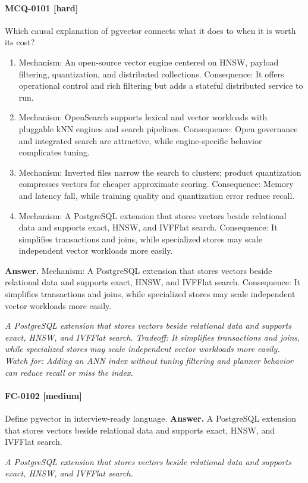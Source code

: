 \paragraph{MCQ-0101 [hard]} Which causal explanation of pgvector connects what it does to when it is worth its cost?
\begin{enumerate}[label=\Alph*.]
\item Mechanism: An open-source vector engine centered on HNSW, payload filtering, quantization, and distributed collections. Consequence: It offers operational control and rich filtering but adds a stateful distributed service to run.
\item Mechanism: OpenSearch supports lexical and vector workloads with pluggable kNN engines and search pipelines. Consequence: Open governance and integrated search are attractive, while engine-specific behavior complicates tuning.
\item Mechanism: Inverted files narrow the search to clusters; product quantization compresses vectors for cheaper approximate scoring. Consequence: Memory and latency fall, while training quality and quantization error reduce recall.
\item Mechanism: A PostgreSQL extension that stores vectors beside relational data and supports exact, HNSW, and IVFFlat search. Consequence: It simplifies transactions and joins, while specialized stores may scale independent vector workloads more easily.
\end{enumerate}
\noindent\textbf{Answer.} Mechanism: A PostgreSQL extension that stores vectors beside relational data and supports exact, HNSW, and IVFFlat search. Consequence: It simplifies transactions and joins, while specialized stores may scale independent vector workloads more easily.
\par\textit{A PostgreSQL extension that stores vectors beside relational data and supports exact, HNSW, and IVFFlat search. Tradeoff: It simplifies transactions and joins, while specialized stores may scale independent vector workloads more easily. Watch for: Adding an ANN index without tuning filtering and planner behavior can reduce recall or miss the index.}
\paragraph{FC-0102 [medium]} Define pgvector in interview-ready language.
\noindent\textbf{Answer.} A PostgreSQL extension that stores vectors beside relational data and supports exact, HNSW, and IVFFlat search.
\par\textit{A PostgreSQL extension that stores vectors beside relational data and supports exact, HNSW, and IVFFlat search.}
